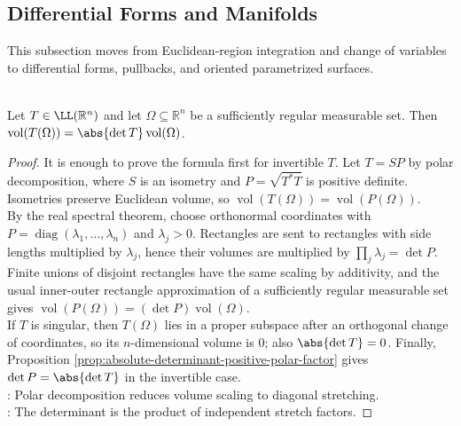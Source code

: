 \subsection{Differential Forms and Manifolds}

%

This subsection moves from Euclidean-region integration and change of variables to differential forms, pullbacks, and oriented parametrized surfaces.

\begin{theorem} \label{thm:linear-map-volume-scaling-determinant} \\
Let $T\in\LL(\mathbb{R}^n)$ and let $\Omega\subseteq\mathbb{R}^n$ be a sufficiently regular measurable set. Then $\operatorname{vol}(T(\Omega))=\abs{\det T}\operatorname{vol}(\Omega)$.
\begin{proof}
It is enough to prove the formula first for invertible $T$. Let $T=SP$ by polar decomposition, where $S$ is an isometry and $P=\sqrt{T^*T}$ is positive definite. Isometries preserve Euclidean volume, so $\operatorname{vol}(T(\Omega))=\operatorname{vol}(P(\Omega))$.\\
By the real spectral theorem, choose orthonormal coordinates with $P=\operatorname{diag}(\lambda_1,\ldots,\lambda_n)$ and $\lambda_j>0$. Rectangles are sent to rectangles with side lengths multiplied by $\lambda_j$, hence their volumes are multiplied by $\prod_j\lambda_j=\det P$. Finite unions of disjoint rectangles have the same scaling by additivity, and the usual inner-outer rectangle approximation of a sufficiently regular measurable set gives $\operatorname{vol}(P(\Omega))=(\det P)\operatorname{vol}(\Omega)$.\\
If $T$ is singular, then $T(\Omega)$ lies in a proper subspace after an orthogonal change of coordinates, so its $n$-dimensional volume is $0$; also $\abs{\det T}=0$. Finally, Proposition \ref{prop:absolute-determinant-positive-polar-factor} gives $\det P=\abs{\det T}$ in the invertible case.\\
: Polar decomposition reduces volume scaling to diagonal stretching.\\
: The determinant is the product of independent stretch factors.
\end{proof}
\end{theorem}

